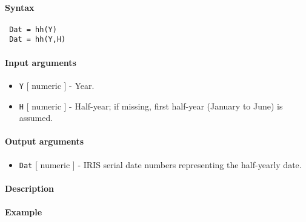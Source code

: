 


	\paragraph{Syntax}
 
 \begin{verbatim}
 Dat = hh(Y)
 Dat = hh(Y,H)
 \end{verbatim}
 
 \paragraph{Input arguments}
 
 \begin{itemize}
 \item
   \texttt{Y} {[} numeric {]} - Year.
 \item
   \texttt{H} {[} numeric {]} - Half-year; if missing, first half-year
   (January to June) is assumed.
 \end{itemize}
 
 \paragraph{Output arguments}
 
 \begin{itemize}
 \item
   \texttt{Dat} {[} numeric {]} - IRIS serial date numbers representing
   the half-yearly date.
 \end{itemize}
 
 \paragraph{Description}
 
 \paragraph{Example}


